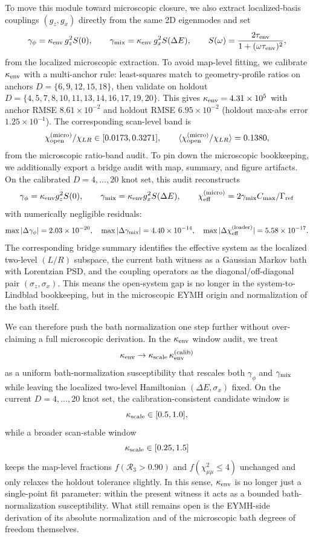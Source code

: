 \documentclass[aps,prd,onecolumn,notitlepage,nofootinbib,superscriptaddress,11pt,floatfix]{revtex4-2}
\begin{document}
To move this module toward microscopic closure, we also extract localized-basis couplings $(g_z,g_x)$ directly from the same 2D eigenmodes and set
\begin{equation}
\gamma_\phi=\kappa_{\rm env}\,g_z^2 S(0),\qquad
\gamma_{\rm mix}=\kappa_{\rm env}\,g_x^2 S(\Delta E),\qquad
S(\omega)=\frac{2\tau_{\rm env}}{1+(\omega\tau_{\rm env})^2},
\end{equation}
from the localized microscopic extraction. To avoid map-level fitting, we calibrate $\kappa_{\rm env}$ with a multi-anchor rule: least-squares match to geometry-profile ratios on anchors $D=\{6,9,12,15,18\}$, then validate on holdout $D=\{4,5,7,8,10,11,13,14,16,17,19,20\}$. This gives $\kappa_{\rm env}=4.31\times10^{5}$ with anchor RMSE $8.61\times10^{-2}$ and holdout RMSE $6.95\times10^{-2}$ (holdout max-abs error $1.25\times10^{-1}$). The corresponding scan-level band is
\begin{equation}
\chi_{\rm open}^{\rm(micro)}/\chi_{LR}\in[0.0173,0.3271],\qquad \langle \chi_{\rm open}^{\rm(micro)}/\chi_{LR}\rangle=0.1380,
\label{eq:chi_open_micro_band}
\end{equation}
from the microscopic ratio-band audit.
To pin down the microscopic bookkeeping, we additionally export a bridge audit with map, summary, and figure artifacts. On the calibrated $D=4,\dots,20$ knot set, this audit reconstructs
\[
\gamma_\phi=\kappa_{\rm env}g_z^2S(0),\qquad
\gamma_{\rm mix}=\kappa_{\rm env}g_x^2S(\Delta E),\qquad
\chi_{\rm eff}^{\rm(micro)}=2\gamma_{\rm mix}C_{\max}/\Gamma_{\rm ref}
\]
with numerically negligible residuals:
\[
\max|\Delta\gamma_\phi|=2.03\times10^{-20},\quad
\max|\Delta\gamma_{\rm mix}|=4.40\times10^{-14},\quad
\max|\Delta\chi_{\rm eff}^{\rm(loader)}|=5.58\times10^{-17}.
\]
The corresponding bridge summary identifies the effective system as the localized two-level $(L/R)$ subspace, the current bath witness as a Gaussian Markov bath with Lorentzian PSD, and the coupling operators as the diagonal/off-diagonal pair $(\sigma_z,\sigma_x)$. This means the open-system gap is no longer in the system-to-Lindblad bookkeeping, but in the microscopic EYMH origin and normalization of the bath itself.

We can therefore push the bath normalization one step further without over-claiming a full microscopic derivation. In the $\kappa_{\rm env}$ window audit, we treat
\[
\kappa_{\rm env}\rightarrow \kappa_{\rm scale}\,\kappa_{\rm env}^{\rm(calib)}
\]
as a uniform bath-normalization susceptibility that rescales both $\gamma_\phi$ and $\gamma_{\rm mix}$ while leaving the localized two-level Hamiltonian $(\Delta E,\sigma_x)$ fixed. On the current $D=4,\dots,20$ knot set, the calibration-consistent candidate window is
\[
\kappa_{\rm scale}\in[0.5,1.0],
\]
while a broader scan-stable window
\[
\kappa_{\rm scale}\in[0.25,1.5]
\]
keeps the map-level fractions $f(\mathcal R_3>0.90)$ and $f(\chi^2_{\mu\mu}\le 4)$ unchanged and only relaxes the holdout tolerance slightly. In this sense, $\kappa_{\rm env}$ is no longer just a single-point fit parameter: within the present witness it acts as a bounded bath-normalization susceptibility. What still remains open is the EYMH-side derivation of its absolute normalization and of the microscopic bath degrees of freedom themselves.
\end{document}

